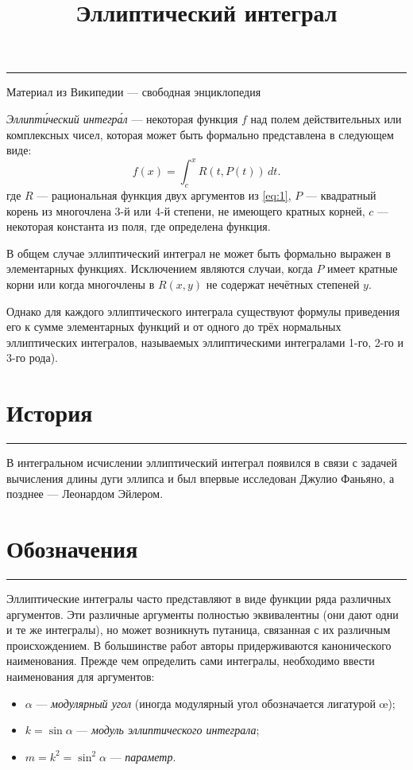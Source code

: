 \documentclass[fleqn]{article}
\title{Эллиптический интеграл}
\begin{document}
	
	\maketitle
	\hrule
	Материал из Википедии --- свободная энциклопедия
	\begin{tcolorbox}[colback=cyan!5!white,colframe=black]
	\end{tcolorbox}
	
	\emph{Эллипт\'{и}ческий интегр\'{а}л} --- некоторая функция $f$ над полем действительных или комплексных чисел, которая может быть формально представлена в следующем виде:
	\begin{equation}\label{eq:1} f(x)=\int^x_cR(t,P(t))\,dt.\end{equation}
	где $R$ — рациональная функция двух аргументов из \eqref{eq:1}, $P$ — квадратный корень из многочлена 3-й или 4-й степени, не имеющего кратных корней, $c$ — некоторая константа из поля, где определена функция.
	
	В общем случае эллиптический интеграл не может быть формально выражен в элементарных функциях. Исключением являются случаи, когда $P$ имеет кратные корни или когда многочлены в $R(x, y)$ не содержат нечётных степеней $y$.
	
	Однако для каждого эллиптического интеграла существуют формулы приведения его к сумме элементарных функций и от одного до трёх нормальных эллиптических интегралов, называемых эллиптическими интегралами 1-го, 2-го и 3-го рода).
	
	\tableofcontents
	
	\section{История} 
	\hrule
	В интегральном исчислении эллиптический интеграл появился в связи с задачей вычисления длины дуги эллипса и был впервые исследован Джулио Фаньяно, а позднее — Леонардом Эйлером.
	\section{Обозначения}
	\hrule
	Эллиптические интегралы часто представляют в виде функции ряда различных аргументов. Эти различные аргументы полностью эквивалентны (они дают одни и те же интегралы), но может возникнуть путаница, связанная с их различным происхождением. В большинстве работ авторы придерживаются канонического наименования. Прежде чем определить сами интегралы, необходимо ввести наименования для аргументов:
	\begin{itemize}
		\item $\alpha$ --- \emph{модулярный угол} (иногда модулярный угол обозначается лигатурой \oe);
		\item $k = \sin{\alpha}$ --- \emph{модуль эллиптического интеграла};
		\item $m=k^2=\sin^2{\alpha}$ --- \emph{параметр}.
	\end{itemize}
	
\end{document}
